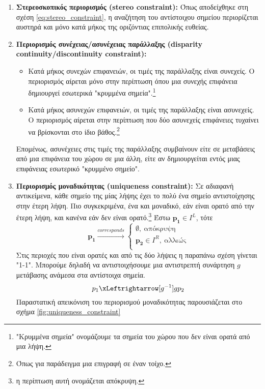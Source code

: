 \begin{enumerate}[label=\textbf{\arabic*.}, ref={\arabic*}]
	\item \label{prop:stereo_contraint} \textbf{Στερεοσκοπικός περιορισμός \e (stereo constraint):} \g Όπως αποδείχθηκε στη σχέση \ref{eq:stereo_constraint}, η αναζήτηση του αντίστοιχου σημείου περιορίζεται αυστηρά και μόνο κατά μήκος της οριζόντιας επιπολικής ευθείας.
	\item \label{prop:disparity_continuity_constraint} \textbf{Περιορισμός συνέχειας/ασυνέχειας παράλλαξης \e (disparity continuity/discontinuity constraint):} \g
	\begin{itemize}
		\item Κατά μήκος συνεχών επιφανειών, οι τιμές της παράλλαξης είναι συνεχείς. Ο περιορισμός αίρεται μόνο στην περίπτωση όπου μια συνεχής επιφάνεια δημιουργεί εσωτερικά "κρυμμένα σημεία".\footnote{"Κρυμμένα σημεία" ονομάζουμε τα σημεία του χώρου που δεν είναι ορατά από μια λήψη.}
		\item Κατά μήκος ασυνεχών επιφανειών, οι τιμές της παράλλαξης είναι ασυνεχείς. Ο περιορισμός αίρεται στην περίπτωση που δύο ασυνεχείς επιφάνειες τυχαίνει να βρίσκονται στο ίδιο βάθος.\footnote{Όπως για παράδειγμα μια επιγραφή σε έναν τοίχο.}
	\end{itemize}
	Επομένως, ασυνέχειες στις τιμές της παράλλαξης συμβαίνουν είτε σε μεταβάσεις από μια επιφάνεια του χώρου σε μια άλλη, είτε αν δημιουργείται εντός μιας επιφάνειας εσωτερικό "κρυμμένο σημείο".
	\item \label{prop:uniqueness_contraint}\textbf{Περιορισμός μοναδικότητας \e (uniqueness constraint):} \g Σε αδιαφανή αντικείμενα, κάθε σημείο της μίας λήψης έχει το πολύ ένα σημείο αντιστοίχησης στην έτερη λήψη. Πιο συγκεκριμένα, ένα και μοναδικό, εάν είναι ορατό από την έτερη λήψη, και κανένα εάν δεν είναι ορατό.\footnote{η περίπτωση αυτή ονομάζεται απόκρυψη.} Έστω $\mathbf{p_1} \in I^{L}$, τότε 
	\[
	\mathbf{p_1}\xrightarrow{corresponds} \left\{
		\begin{array}{ll}
			\emptyset,\: \text{απόκρυψη} \\
            	\mathbf{p_2} \in I^{R},\: \text{αλλιώς}  \\
         \end{array}
          						\right.
    \]
    Στις περιοχές που είναι ορατές και από τις δύο λήψεις η παραπάνω σχέση γίνεται "1-1". Μπορούμε δηλαδή να αντιστοιχήσουμε μια αντιστρεπτή συνάρτηση $g$ μετάβασης ανάμεσα στα αντίστοιχα σημεία.
	\[
	p_1 \xLeftrightarrow[g^{-1}]{g} p_2
	\]
	Παραστατική απεικόνιση του περιορισμού μοναδικότητας παρουσιάζεται στο σχήμα \ref{fig:uniqueness_constraint}

\end{enumerate}
